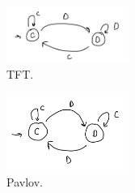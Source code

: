 \documentclass[11pt]{amsart}
\theoremstyle{definition}
\theoremstyle{remark}
\begin{document}
\begin{figure}
  \includegraphics[width=4cm]{tft.jpg}
  \centering
  \caption{TFT.}
  \end{figure}
\begin{figure}
  \includegraphics[width=4cm]{pavlov.jpg}
  \centering
  \caption{Pavlov.}
  \end{figure}
\end{document}
